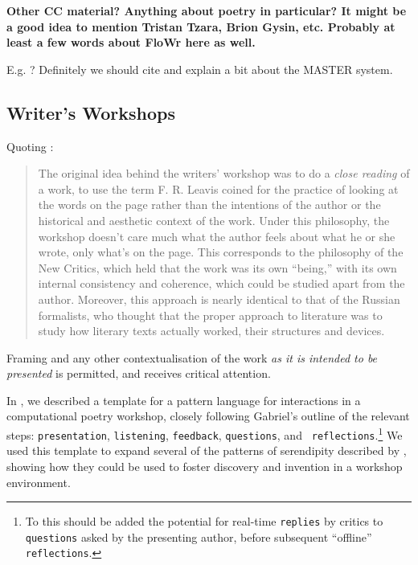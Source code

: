 \begin{mdframed}
\textbf{Other CC material?  Anything about poetry in particular?  It
  might be a good idea to mention Tristan Tzara, Brion Gysin, etc.
  Probably at least a few words about FloWr here as well.}

 E.g. \cite{jordanous10}?  Definitely we should cite
\cite{misztal2014poetry} and explain a bit about the MASTER system.
\end{mdframed}

\subsection{Writer's Workshops}

Quoting \cite[pp. 2--3]{gabriel2002writer}:

\begin{quote}
The original idea behind the writers' workshop was to do a \emph{close
  reading} of a work, to use the term F. R. Leavis coined for the
practice of looking at the words on the page rather than the
intentions of the author or the historical and aesthetic context of
the work.  Under this philosophy, the workshop doesn't care much what
the author feels about what he or she wrote, only what's on the page.
This corresponds to the philosophy of the New Critics, which held that
the work was its own ``being,'' with its own internal consistency and
coherence, which could be studied apart from the author.  Moreover,
this approach is nearly identical to that of the Russian formalists,
who thought that the proper approach to literature was to study how
literary texts actually worked, their structures and devices.
\end{quote}

Framing and any other contextualisation of the work \emph{as it is
  intended to be presented} is permitted, and receives critical attention.

In \cite{serendipity-arxiv}, we described a template for a pattern
language for interactions in a computational poetry workshop, closely
following Gabriel's outline of the relevant steps: {\tt presentation},
{\tt listening}, {\tt feedback}, {\tt questions}, and {\tt
  reflections}.\footnote{To this should be added the potential for
  real-time {\tt replies} by critics to {\tt questions} asked by the
  presenting author, before subsequent ``offline'' {\tt reflections}.}
We used this template to expand several of the patterns of serendipity
described by \cite{van1994anatomy}, showing how they could be used to
foster discovery and invention in a workshop environment.



